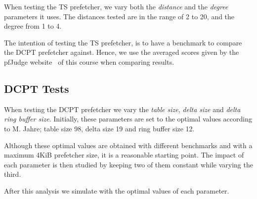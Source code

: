 When testing the TS prefetcher, we vary both the \emph{distance} and the
\emph{degree} parameters it uses. The distances tested are in the range of 2 to
20, and the degree from 1 to 4.

The intention of testing the TS prefetcher, is to have a benchmark to compare
the DCPT prefetcher against. Hence, we use the averaged scores given by the
pfJudge website~\cite[Sec.~2.5]{guidelines} of this course when comparing
results.

\subsection{DCPT Tests}

When testing the DCPT prefetcher we vary the \emph{table size}, \emph{delta
size} and \emph{delta ring buffer size}. Initially, these parameters are set to
the optimal values according to M. Jahre\cite{dcpt}; table size 98, delta size
19 and ring buffer size 12.

Although these optimal values are obtained with different benchmarks and with a
maximum 4KiB prefetcher size, it is a reasonable starting point. The impact of
each parameter is then studied by keeping two of them constant while varying the
third.

After this analysis we simulate with the optimal values of each parameter.

